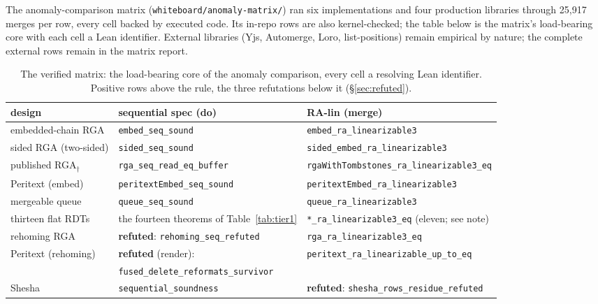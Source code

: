 \documentclass[11pt]{article}
\newcommand{\code}[1]{\texttt{#1}}
\begin{document}
The anomaly-comparison matrix
(\code{whiteboard/anomaly-matrix/}) ran six implementations and four
production libraries through 25{,}917 merges per row, every cell
backed by executed code. Its in-repo rows are also kernel-checked; the table below is the matrix's
load-bearing core with each cell a Lean identifier. External libraries
(Yjs, Automerge, Loro, list-positions) remain empirical by nature; the
complete external rows remain in the matrix report.

\begin{table}[h]
\centering
\scriptsize
\begin{tabular}{@{}lll@{}}
\toprule
design & sequential spec (do) & RA-lin (merge) \\
\midrule
embedded-chain RGA & \code{embed\_seq\_sound} &
  \code{embed\_ra\_linearizable3} \\
sided RGA (two-sided) & \code{sided\_seq\_sound} &
  \code{sided\_embed\_ra\_linearizable3} \\
published RGA$_\dagger$ & \code{rga\_seq\_read\_eq\_buffer} &
  \code{rgaWithTombstones\_ra\_linearizable3\_eq} \\
Peritext (embed) & \code{peritextEmbed\_seq\_sound} &
  \code{peritextEmbed\_ra\_linearizable3} \\
mergeable queue & \code{queue\_seq\_sound} &
  \code{queue\_ra\_linearizable3} \\
thirteen flat RDTs & the fourteen theorems of Table~\ref{tab:tier1} &
  \code{*\_ra\_linearizable3\_eq} (eleven; see note) \\
\midrule
rehoming RGA & \textbf{refuted}: \code{rehoming\_seq\_refuted} &
  \code{rga\_ra\_linearizable3\_eq} \\
Peritext (rehoming) & \textbf{refuted} (render): &
  \code{peritext\_ra\_linearizable\_up\_to\_eq} \\
 & \quad\code{fused\_delete\_reformats\_survivor} & \\
Shesha & \code{sequential\_soundness} &
  \textbf{refuted}: \code{shesha\_rows\_residue\_refuted} \\
\bottomrule
\end{tabular}
\caption{The verified matrix: the load-bearing core of the anomaly
comparison, every cell a resolving Lean identifier. Positive rows
above the rule, the three refutations below it
(\S\ref{sec:refuted}).}
\label{tab:seqmatrix}
\end{table}
\end{document}
